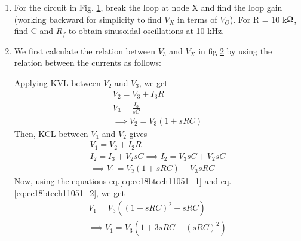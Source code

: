 \begin{enumerate}[label=\arabic*.,ref=\theenumi]

\item

For the circuit in Fig. \ref{fig:ee18btech11051_fig1}, break the loop at node X and find the loop gain (working backward for simplicity to find $V_{X}$ in terms of $V_{O}$). For R = 10 k$\ohm$, find C and $R_{f}$ to obtain sinusoidal oscillations at 10 kHz.

\begin{figure}[!ht]
	\begin{center}
		\resizebox{\columnwidth}{!}{}
	\end{center}
\caption{}
\label{fig:ee18btech11051_fig1}
\end{figure}

\item
\solution
We first calculate the relation between $V_{3}$ and $V_{X}$ in fig \ref{fig:ee18btech11051_fig2} by using the relation between the currents as follows:
\begin{figure}[!ht]
	\begin{center}
		\resizebox{\columnwidth}{!}{}
	\end{center}
\caption{}
\label{fig:ee18btech11051_fig2}
\end{figure}

Applying KVL between $V_{2}$ and $V_{3}$, we get
\begin{align}
    V_{2} = V_{3} + I_{3}R\\
    V_{3} = \frac{I_{3}}{sC}\\
    \implies V_{2} = V_{3}(1+sRC) \label{eq:ee18btech11051_1}
\end{align}
Then, KCL between $V_{1}$ and $V_{2}$ gives 
\begin{align}
    V_{1} = V_{2} + I_{2}R\\
    I_{2} = I_{3} + V_{2}sC
    \implies I_{2} = V_{3}sC + V_{2}sC\\
    \implies V_{1} = V_{2}(1+sRC) + V_{3}sRC \label{eq:ee18btech11051_2}
\end{align}
Now, using the equations eq.\ref{eq:ee18btech11051_1} and eq.\ref{eq:ee18btech11051_2}, we get
\begin{align}
    V_{1} = V_{3}((1+sRC)^{2}+sRC)\\
    \implies V_{1} = V_{3}(1+ 3sRC+ (sRC)^{2})\label{eq:ee18btech11051_3}
\end{align}


\end{enumerate}
